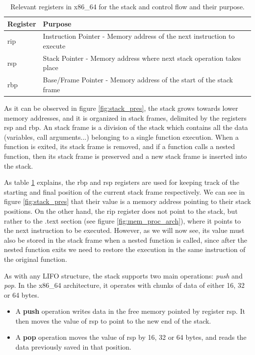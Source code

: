 \documentclass[12pt]{report} %
\begin{document}
\begin{table}[H]
\begin{tabular}{|>{\centering\arraybackslash}p{2cm}|>{\centering\arraybackslash}p{10cm}|}
\hline
Register & Purpose\\
\hline
\hline
rip & Instruction Pointer - Memory address of the next instruction to execute\\
\hline
rsp & Stack Pointer - Memory address where next stack operation takes place\\
\hline
rbp & Base/Frame Pointer - Memory address of the start of the stack frame\\
\hline
\end{tabular}
\caption{Relevant registers in x86\_64 for the stack and control flow and their purpose.}
\label{table:systemv_abi_other}
\end{table}

As it can be observed in figure \ref{fig:stack_pres}, the stack grows towards lower memory addresses, and it is organized in stack frames, delimited by the registers rsp and rbp. An stack frame is a division of the stack which contains all the data (variables, call arguments...) belonging to a single function execution. When a function is exited, its stack frame is removed, and if a function calls a nested function, then its stack frame is preserved and a new stack frame is inserted into the stack. 

As table \ref{table:systemv_abi_other} explains, the rbp and rsp registers are used for keeping track of the starting and final position of the current stack frame respectively. We can see in figure \ref{fig:stack_pres} that their value is a memory address pointing to their stack positions. On the other hand, the rip register does not point to the stack, but rather to the .text section (see figure \ref{fig:mem_proc_arch}), where it points to the next instruction to be executed. However, as we will now see, its value must also be stored in the stack frame when a nested function is called, since after the nested function exits we need to restore the execution in the same instruction of the original function.

As with any LIFO structure, the stack supports two main operations: \textit{push} and \textit{pop}. In the x86\_64 architecture, it operates with chunks of data of either 16, 32 or 64 bytes.
\begin{itemize}
\item A \textbf{push} operation writes data in the free memory pointed by register rsp. It then moves the value of rsp to point to the new end of the stack.
\item A \textbf{pop} operation moves the value of rsp by 16, 32 or 64 bytes, and reads the data previously saved in that position.
\end{itemize}
\end{document}
